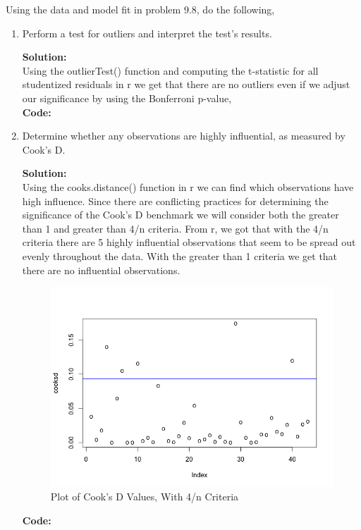 \documentclass[12pt]{article}
\makeatletter
\theoremstyle{homework}
\newenvironment{exercise}[1]
{\def\@currentlabel{#1}\exercisecore}
{\endexercisecore}
\newcommand{\localhead}[1]{\par\smallskip\noindent\textbf{#1}\nobreak\\}%
\newcommand\solution{\localhead{Solution:}}
\makeatother
\begin{document}
\begin{exercise}{3} Using the data and model fit in problem 9.8, do the following, 
  \begin{enumerate}
    \item Perform a test for outliers and interpret the test's results. \\
    \solution Using the outlierTest() function and computing the t-statistic for all studentized residuals in r 
    we get that there are no outliers even if we adjust our significance by using the Bonferroni p-value, \\
    \textbf{Code:}
    \begin{center}
    
    \end{center} 
    \newpage

    \item Determine whether any observations are highly influential, as measured by Cook's D.\\
    \solution Using the cooks.distance() function in r we can find which observations have high influence.
    Since there are conflicting practices for determining the significance of the Cook's D benchmark we will consider both the 
    greater than 1 and greater than 4/n criteria. From r, we got that with the 4/n criteria there are 5 highly influential observations
    that seem to be spread out evenly throughout the data. With the greater than 1 criteria we get that there are no influential observations. 
    \begin{figure}[H]
      \begin{center}
      \caption{Plot of Cook's D Values, With 4/n Criteria}
      \includegraphics[width = .94\textwidth]{Rplot03.png}
    \end{center}
  \end{figure}
  \textbf{Code:}
  \begin{center}
  
  \end{center} 
  \newpage




\end{enumerate}
\end{exercise}
\end{document}
